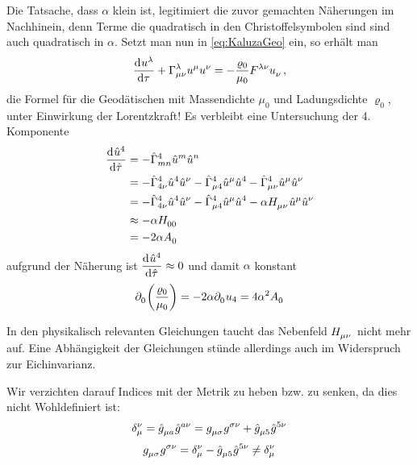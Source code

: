 Die Tatsache, dass $\alpha$ klein ist, legitimiert
die zuvor gemachten Näherungen im Nachhinein, denn Terme die quadratisch in den
Christoffelsymbolen sind sind auch quadratisch in $\alpha$.
Setzt man nun in \eqref{eq:KaluzaGeo} ein, so erhält man
\begin{equation}
\dod{\tensor{u}{^\lambda}}{\tau}
+\tensor*{\Gamma}{^\lambda_\mu_\nu}\tensor{u}{^\mu}\tensor{u}{^\nu}
=-\frac{\varrho_0}{\mu_0}\tensor{F}{^\lambda^\nu}\tensor{u}{_\nu}\, ,
\end{equation}
die Formel für die Geodätischen mit Massendichte $\mu_0$ und Ladungsdichte
$\varrho_0$, unter Einwirkung der Lorentzkraft! Es verbleibt eine
Untersuchung der 4. Komponente
\begin{equation}
\begin{split}
\dod{\tensor{\hat{u}}{^4}}{\hat{\tau}}
&=
-\tensor*{\hat{\Gamma}}{^4_m_n}\tensor{\hat{u}}{^m}\tensor{\hat{u}}{^n}\\
&=
-\tensor*{\hat{\Gamma}}{^4_4_\nu}\tensor{\hat{u}}{^4}\tensor{\hat{u}}{^\nu}
-\tensor*{\hat{\Gamma}}{^4_\mu_4}\tensor{\hat{u}}{^\mu}\tensor{\hat{u}}{^4}
-\tensor*{\hat{\Gamma}}{^4_\mu_\nu}\tensor{\hat{u}}{^\mu}\tensor{\hat{u}}{^\nu}\\
&=
-\tensor*{\hat{\Gamma}}{^4_4_\nu}\tensor{\hat{u}}{^4}\tensor{\hat{u}}{^\nu}
-\tensor*{\hat{\Gamma}}{^4_\mu_4}\tensor{\hat{u}}{^\mu}\tensor{\hat{u}}{^4}
-\alpha\tensor{H}{_\mu_\nu}\tensor{\hat{u}}{^\mu}\tensor{\hat{u}}{^\nu}\\
&\approx
-\alpha\tensor{H}{_0_0}\\
&=
-2\alpha\tensor{A}{_0}\\
\end{split}
\end{equation}
aufgrund der Näherung ist $\dod{\tensor{\hat{u}}{^4}}{\hat{\tau}}\approx 0$ und
damit $\alpha$ konstant
\begin{equation}
\begin{split}
\tensor{\partial}{_0}\left(\frac{\varrho_0}{\mu_0}\right)
=-2\alpha\tensor{\partial}{_0}u_4=
4\alpha^2\tensor{A}{_0}
\end{split}
\end{equation}
\begin{bemerkung}
In den physikalisch relevanten Gleichungen taucht das Nebenfeld
$\tensor{H}{_\mu_\nu}$ nicht mehr auf. Eine Abhängigkeit der Gleichungen stünde
allerdings auch im Widerspruch zur Eichinvarianz.
\end{bemerkung}
\begin{bemerkung}
Wir verzichten darauf Indices mit der Metrik zu heben bzw. zu senken, da dies
nicht Wohldefiniert ist:
\begin{equation}
\tensor*{\delta}{*_\mu^\nu}=\tensor{\hat{g}}{_\mu_a}\tensor{\hat{g}}{^a^\nu}
=\tensor{g}{_\mu_\sigma}\tensor{g}{^\sigma^\nu}+\tensor{\hat{g}}{_\mu_5}\tensor{\hat{g}}{^5^\nu}
\end{equation}
\begin{equation}
\tensor{g}{_\mu_\sigma}\tensor{g}{^\sigma^\nu}
=\tensor*{\delta}{*_\mu^\nu}-\tensor{\hat{g}}{_\mu_5}\tensor{\hat{g}}{^5^\nu}\neq\tensor*{\delta}{*_\mu^\nu}
\end{equation}
\end{bemerkung}
